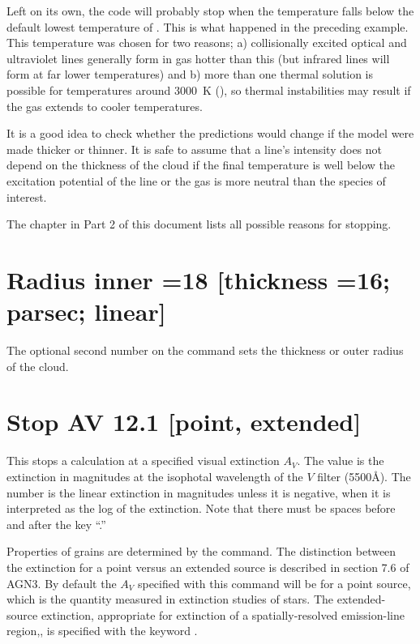 Left on its own, the code will probably stop when the temperature falls
below the default lowest temperature of \TEMPSTOPDEFAULT.  This is what happened in
the preceding example.  This temperature was chosen for two reasons; a)
collisionally excited optical and ultraviolet lines generally form in gas
hotter than this (but infrared lines will form at far lower temperatures)
and b) more than one thermal solution is possible for temperatures around
3000~K (\citealp{Williams1967}), so thermal instabilities may result if the gas
extends to cooler temperatures.

It is a good idea to check whether the predictions would change if the
model were made thicker or thinner.  It is safe to assume that a line's
intensity does not depend on the thickness of the cloud if the final
temperature is well below the excitation potential of the line or the gas
is more neutral than the species of interest.

The chapter  in Part 2 of this document
lists all possible reasons for stopping.

\section{Radius inner =18 [thickness =16; parsec; linear]}

The optional
second number on the  command
sets the thickness or outer radius of the cloud.

\section{Stop AV 12.1 [point, extended]}

This stops a calculation at a specified visual extinction $A_V$.
The value
is the extinction in magnitudes at the isophotal wavelength of the $V$ filter
(5500\AA ).
The number is the linear extinction in magnitudes unless it
is negative, when it is interpreted as the log of the extinction.
Note
that there must be spaces before and after the key ``.''

Properties of grains are determined by the  command.
The distinction between the extinction for a point
versus an extended source is described in
section 7.6 of AGN3.
By default the $A_V$ specified with this command will
be for a point source,
which is the quantity measured in extinction studies
of stars.
The extended-source extinction, appropriate for extinction
of a spatially-resolved emission-line region,,
is specified with the keyword .


